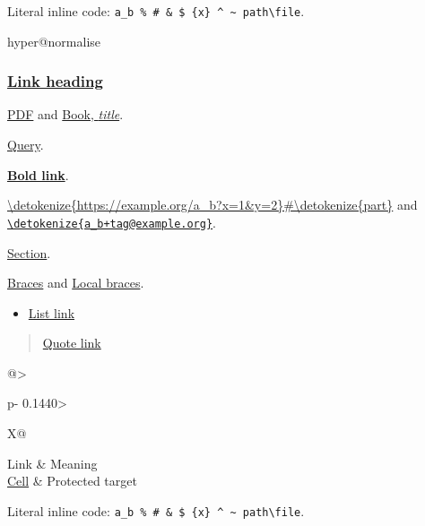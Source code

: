 Literal inline code: \texttt{a\_b \% \# \& \$ \{x\} \textasciicircum{} \textasciitilde{} path\textbackslash{}file}.

\ifcsname hyper@normalise\endcsname\else\PackageError{mark2tex}{Markdown links require hyperref}{Load \string\usepackage{hyperref} in the document preamble.}\fi
\begin{frame}[t]
\frametitle{\href{\detokenize{https://example.org/heading}}{Link heading}}

\end{frame}

\begin{frame}[t]

\href{\detokenize{unterlagen/Auswahl der Inhalte.pdf}}{PDF} and \href{\detokenize{books/Book_name.pdf}}{Book, \emph{title}}.

\href{\detokenize{https://example.org/a}\%\detokenize{20b}\%\detokenize{20c?x=1&y=$@_}\#\detokenize{frag}}{Query}.

\textbf{\href{\detokenize{https://example.org/bold}\%\detokenize{20text?a=1&b=2}\#\detokenize{part}}{Bold link}}.

\url{\detokenize{https://example.org/a_b?x=1&y=2}\#\detokenize{part}} and \href{\detokenize{mailto:a_b+tag@example.org}}{\nolinkurl{\detokenize{a_b+tag@example.org}}}.

\hyperref[\detokenize{grundlagen}]{Section}.

\href{\detokenize{https://example.org/a}\Uchar123 \detokenize{b}\Uchar125 \Uchar94 \Uchar94 \detokenize{c}\Uchar92 \detokenize{d}}{Braces} and \href{\detokenize{unterlagen/a}\Uchar123 \detokenize{b}\Uchar125 \detokenize{.pdf}}{Local braces}.

\begin{itemize}
\item \href{\detokenize{https://example.org/list}}{List link}
\end{itemize}

\begin{quote}
\href{\detokenize{https://example.org/quote}}{Quote link}
\end{quote}

\par\addvspace{\medskipamount}
\noindent\begin{tabularx}{\linewidth}{@{}>{\raggedright\arraybackslash}p{}>{\raggedright\arraybackslash}X@{}}
\toprule
Link & Meaning \\
\midrule
\href{\detokenize{https://example.org/$@_}}{Cell} & Protected target \\
\bottomrule
\end{tabularx}
\par\addvspace{\medskipamount}

Literal inline code: \texttt{a\_b \% \# \& \$ \{x\} \textasciicircum{} \textasciitilde{} path\textbackslash{}file}.

\end{frame}

